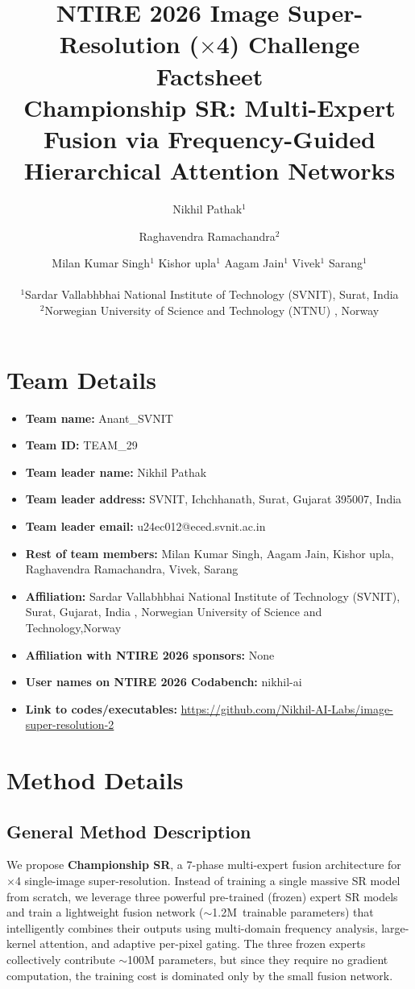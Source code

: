 \documentclass[10pt,twocolumn,letterpaper]{article}
\title{NTIRE 2026 Image Super-Resolution ($\times$4) Challenge Factsheet\\
Championship SR: Multi-Expert Fusion via Frequency-Guided\\Hierarchical Attention Networks}
\author{Nikhil Pathak$^{1}$\\
\and
Raghavendra Ramachandra$^{2}$\\
\and
Milan Kumar Singh$^{1}$ \quad Kishor upla$^{1}$ \quad Aagam Jain$^{1}$ \quad Vivek$^{1}$ \quad Sarang$^{1}$\\
\\
$^{1}$Sardar Vallabhbhai National Institute of Technology (SVNIT), Surat, India
\\
$^{2}$Norwegian University of Science and Technology (NTNU) , Norway
}
\begin{document}
\maketitle

\section{Team Details}

\begin{itemize}[nosep,leftmargin=*]
\item \textbf{Team name:} Anant\_SVNIT
\item \textbf{Team ID:} TEAM\_29
\item \textbf{Team leader name:} Nikhil Pathak
\item \textbf{Team leader address:} SVNIT, Ichchhanath, Surat, Gujarat 395007, India
\item \textbf{Team leader email:} u24ec012@eced.svnit.ac.in
\item \textbf{Rest of team members:} Milan Kumar Singh, Aagam Jain, Kishor upla, Raghavendra Ramachandra, Vivek, Sarang
\item \textbf{Affiliation:} Sardar Vallabhbhai National Institute of Technology (SVNIT), Surat, Gujarat, India ,
Norwegian University of Science and Technology,Norway 
\item \textbf{Affiliation with NTIRE 2026 sponsors:} None
\item \textbf{User names on NTIRE 2026 Codabench:} nikhil-ai
\item \textbf{Link to codes/executables:} \url{https://github.com/Nikhil-AI-Labs/image-super-resolution-2}
\end{itemize}

\section{Method Details}

\subsection{General Method Description}

We propose \textbf{Championship SR}, a 7-phase multi-expert fusion architecture for $\times$4 single-image super-resolution. Instead of training a single massive SR model from scratch, we leverage three powerful pre-trained (frozen) expert SR models and train a lightweight fusion network ($\sim$1.2M~trainable parameters) that intelligently combines their outputs using multi-domain frequency analysis, large-kernel attention, and adaptive per-pixel gating. The three frozen experts collectively contribute $\sim$100M parameters, but since they require no gradient computation, the training cost is dominated only by the small fusion network.
\end{document}
